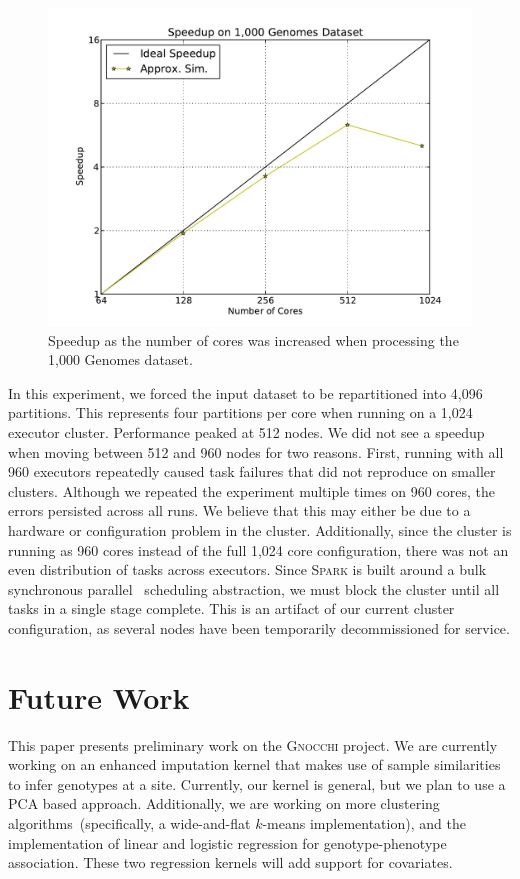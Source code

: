 \documentclass[11pt]{article} %
\begin{document}
\begin{figure}[ht]
\begin{center}
\includegraphics[width=0.75\linewidth]{graphs/speedup_1kg.pdf}
\end{center}
\caption{Speedup as the number of cores was increased when processing the 1,000
Genomes dataset.}
\label{fig:1kg}
\end{figure}

In this experiment, we forced the input dataset to be repartitioned into 4,096
partitions. This represents four partitions per core when running on a 1,024
executor cluster. Performance peaked at 512 nodes. We did not see a speedup when
moving between 512 and 960 nodes for two reasons. First, running with all 960
executors repeatedly caused task failures that did not reproduce on smaller
clusters. Although we repeated the experiment multiple times on 960 cores, the
errors persisted across all runs. We believe that this may either be due to a
hardware or configuration problem in the cluster. Additionally, since the
cluster is running as 960 cores instead of the full 1,024 core configuration,
there was not an even distribution of tasks across executors. Since
\textsc{Spark} is built around a bulk synchronous parallel~\cite{zaharia12}
scheduling abstraction, we must block the cluster until all tasks in a single
stage complete. This is an artifact of our current cluster configuration, as
several nodes have been temporarily decommissioned for service.

\section{Future Work}
\label{sec:future-work}

This paper presents preliminary work on the \textsc{Gnocchi} project. We are
currently working on an enhanced imputation kernel that makes use of sample
similarities to infer genotypes at a site. Currently, our kernel is general,
but we plan to use a PCA based approach. Additionally, we are working on more
clustering algorithms~(specifically, a wide-and-flat $k$-means implementation),
and the implementation of linear and logistic regression for genotype-phenotype
association. These two regression kernels will add support for covariates.
\end{document}
